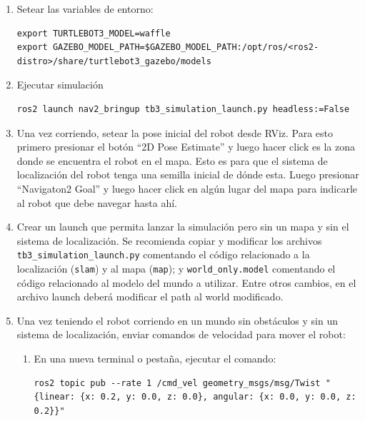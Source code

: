 \documentclass[tp]{lcc}
\begin{document}
\begin{enumerate}

\item Setear las variables de entorno:

\begin{lstlisting}[style=bash] 
export TURTLEBOT3_MODEL=waffle
export GAZEBO_MODEL_PATH=$GAZEBO_MODEL_PATH:/opt/ros/<ros2-distro>/share/turtlebot3_gazebo/models
\end{lstlisting}
	\item Ejecutar simulación

\begin{lstlisting}[style=bash] 
ros2 launch nav2_bringup tb3_simulation_launch.py headless:=False
\end{lstlisting}


	\item Una vez corriendo, setear la pose inicial del robot desde RViz. Para esto primero presionar el botón ``2D Pose Estimate'' y luego hacer click es la zona donde se encuentra el robot en el mapa. Esto es para que el sistema de localización del robot tenga una semilla inicial de dónde esta. Luego presionar ``Navigaton2 Goal'' y luego hacer click en algún lugar del mapa para indicarle al robot que debe navegar hasta ahí.

	\item Crear un launch que permita lanzar la simulación pero sin un mapa y sin el sistema de localización. Se recomienda copiar y modificar los archivos \lstinline{tb3_simulation_launch.py} comentando el código relacionado a la localización (\lstinline{slam}) y al mapa (\lstinline{map}); y \lstinline{world_only.model} comentando el código relacionado al modelo del mundo a utilizar. Entre otros cambios, en el archivo launch deberá modificar el path al world modificado.

	\item Una vez teniendo el robot corriendo en un mundo sin obstáculos y sin un sistema de localización, enviar comandos de velocidad para mover el robot:

	\begin{enumerate}
	\item En una nueva terminal o pestaña, ejecutar el comando:

\begin{lstlisting}[style=bash] 
ros2 topic pub --rate 1 /cmd_vel geometry_msgs/msg/Twist "{linear: {x: 0.2, y: 0.0, z: 0.0}, angular: {x: 0.0, y: 0.0, z: 0.2}}"
\end{lstlisting}


\end{enumerate}
\end{enumerate}
\end{document}
